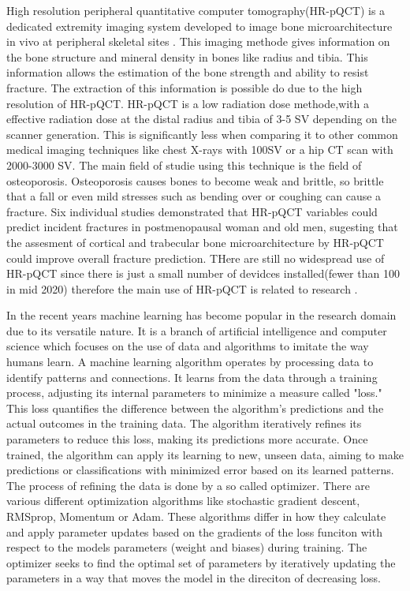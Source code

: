 \documentclass[
a4paper, 
12pt,
grayscalebody, %
abstract=on,
twoside, BCOR10mm, 12pt, DIV13,headinclude, footexclude, final, abstracton, openright
]{ibireprt}
\numberwithin{equation}{chapter}
\numberwithin{table}{chapter}
\numberwithin{figure}{chapter}
\numberwithin{algorithm}{chapter}
\numberwithin{example}{chapter}
\numberwithin{example}{chapter}
\begin{document}
High resolution peripheral quantitative computer tomography(HR-pQCT) is a  dedicated extremity imaging system developed to image bone microarchitecture in vivo at peripheral skeletal sites \cite{Bergh2021}. This imaging methode gives information on the bone structure and mineral density in bones like radius and tibia. This information allows the estimation of the bone strength and ability to resist fracture. The extraction of this information is possible do due to the high resolution of HR-pQCT. HR-pQCT is a low radiation dose methode,with a effective radiation dose at the distal radius and tibia of  3-5 \textmu SV depending on the scanner  generation. This is significantly less when comparing it to other common medical imaging techniques like chest X-rays with 100\textmu SV or a hip CT scan with 2000-3000 \textmu SV. The main field of studie using this technique is the field of osteoporosis. Osteoporosis causes bones to become weak and brittle, so brittle that a fall or even mild stresses such as bending over or coughing can cause a fracture. Six individual studies demonstrated that HR-pQCT variables could predict incident fractures in postmenopausal woman and old men, sugesting that the assesment of cortical and trabecular bone microarchitecture by HR-pQCT could improve overall fracture prediction. THere are still no widespread use of HR-pQCT since there is just a small number of devidces installed(fewer than 100 in mid 2020) therefore the main use of HR-pQCT is related to research \cite{Bergh2021}.

In the recent years machine learning has become popular in the research domain due to its versatile nature. It is a branch of artificial intelligence and computer science which focuses on the use of data and algorithms to imitate the way humans learn. A machine learning algorithm operates by processing data to identify patterns and connections. It learns from the data through a training process, adjusting its internal parameters to minimize a measure called "loss." This loss quantifies the difference between the algorithm's predictions and the actual outcomes in the training data. The algorithm iteratively refines its parameters to reduce this loss, making its predictions more accurate. Once trained, the algorithm can apply its learning to new, unseen data, aiming to make predictions or classifications with minimized error based on its learned patterns.
The process of refining the data is done by a so called optimizer. There are various different optimization algorithms like stochastic gradient descent, RMSprop, Momentum or Adam. These algorithms differ in how they calculate and apply parameter updates based on the gradients of the loss funciton with respect to the models parameters (weight and biases) during training. The optimizer  seeks to find the optimal set of parameters by iteratively updating the parameters in a way that moves the model in the direciton of decreasing loss.
\end{document}
